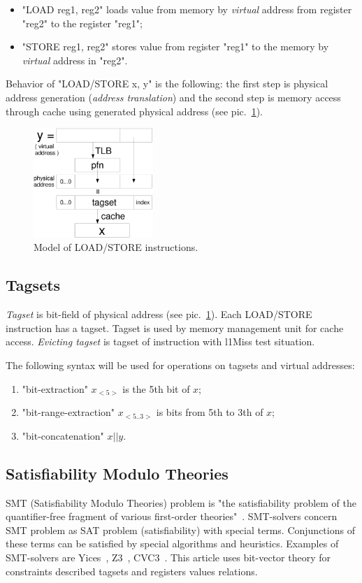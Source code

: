 \documentclass[times, 10pt,twocolumn]{article}
\begin{document}
\begin{itemize}
\item "LOAD reg1, reg2" loads value from memory by \emph{virtual} address from register "reg2" to the register "reg1";
\item "STORE reg1, reg2" stores value from register "reg1" to the
memory by \emph{virtual} address in "reg2".
\end{itemize}

Behavior of "LOAD/STORE x, y" is the following: the first step is
physical address generation (\emph{address translation}) and the
second step is memory access through cache using generated physical address (see pic.~\ref{LOAD}).

\begin{figure}[h]\label{LOAD}
\includegraphics[width=0.4\textwidth]{load}
\caption{Model of LOAD/STORE instructions.}
\end{figure} %

\subsection{Tagsets}

\emph{Tagset} is bit-field of physical address (see pic.~\ref{LOAD}). Each LOAD/STORE instruction has a tagset. Tagset is used by memory management unit for cache access.
\emph{Evicting tagset} is tagset of instruction with l1Miss test situation.

The following syntax will be used for operations on tagsets and virtual addresses:
\begin{enumerate}
\item "bit-extraction" $x_{<5>}$ is the 5th bit of $x$;
\item "bit-range-extraction" $x_{<5..3>}$ is bits from 5th to 3th of $x$;
\item "bit-concatenation" $x||y$.
\end{enumerate}

\subsection{Satisfiability Modulo Theories}
SMT (Satisfiability Modulo Theories) problem is "the satisfiability
problem of the quantifier-free fragment of various first-order
theories"~\cite{SMT}. SMT-solvers concern SMT problem as SAT problem
(satisfiability) with special terms. Conjunctions of these terms can
be satisfied by special algorithms and heuristics. Examples of
SMT-solvers are Yices~\cite{Yices}, Z3~\cite{Z3}, CVC3~\cite{CVC3}.
This article uses bit-vector theory for constraints described
tagsets and registers values relations.
\end{document}

